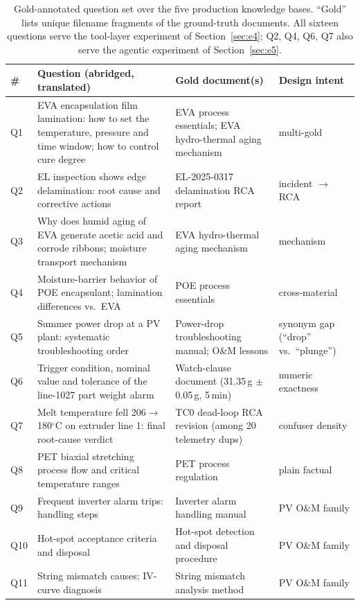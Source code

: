 \begin{table}[t]
\centering
\scriptsize
\setlength{\tabcolsep}{3pt}
\caption{Gold-annotated question set over the five production knowledge
bases. ``Gold'' lists unique filename fragments of the ground-truth
documents. All sixteen questions serve the tool-layer experiment of
Section~\ref{sec:e4}; Q2, Q4, Q6, Q7 also
serve the agentic experiment of Section~\ref{sec:e5}.}
\label{tab:questions}
\begin{tabular}{lp{5.3cm}p{4.0cm}p{2.8cm}}
\toprule
\# & Question (abridged, translated) & Gold document(s) & Design intent \\
\midrule
Q1 & EVA encapsulation film lamination: how to set the temperature, pressure
and time window; how to control cure degree & EVA process essentials; EVA
hydro-thermal aging mechanism & multi-gold \\
Q2 & EL inspection shows edge delamination: root cause and corrective
actions & EL-2025-0317 delamination RCA report & incident $\to$ RCA \\
Q3 & Why does humid aging of EVA generate acetic acid and corrode ribbons;
moisture transport mechanism & EVA hydro-thermal aging mechanism & mechanism \\
Q4 & Moisture-barrier behavior of POE encapsulant; lamination differences
vs.\ EVA & POE process essentials & cross-material \\
Q5 & Summer power drop at a PV plant: systematic troubleshooting order &
Power-drop troubleshooting manual; O\&M lessons & synonym gap
(``drop'' vs.\ ``plunge'') \\
Q6 & Trigger condition, nominal value and tolerance of the line-1027 part
weight alarm & Watch-clause document (31.35\,g $\pm$0.05\,g, 5\,min) &
numeric exactness \\
Q7 & Melt temperature fell 206$\to$180$^\circ$C on extruder line 1: final
root-cause verdict & TC0 dead-loop RCA revision (among 20 telemetry dups) &
confuser density \\
Q8 & PET biaxial stretching process flow and critical temperature ranges &
PET process regulation & plain factual \\
Q9 & Frequent inverter alarm trips: handling steps & Inverter alarm handling
manual & PV O\&M family \\
Q10 & Hot-spot acceptance criteria and disposal & Hot-spot detection and
disposal procedure & PV O\&M family \\
Q11 & String mismatch causes; IV-curve diagnosis & String mismatch analysis
method & PV O\&M family \\

\end{tabular}
\end{table}
